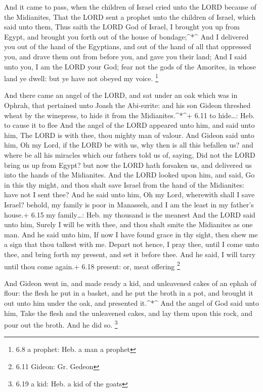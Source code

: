  And it came to pass, when the children of Israel cried unto
the LORD because of the Midianites,  That the LORD sent a
prophet unto the children of Israel, which said unto them, Thus saith
the LORD God of Israel, I brought you up from Egypt, and brought you
forth out of the house of bondage;\^{}*\^{}  And I delivered
you out of the hand of the Egyptians, and out of the hand of all that
oppressed you, and drave them out from before you, and gave you their
land;  And I said unto you, I am the LORD your God; fear
not the gods of the Amorites, in whose land ye dwell: but ye have not
obeyed my voice. \footnote{6.8 a prophet: Heb. a man a prophet}

 And there came an angel of the LORD, and sat under an oak
which was in Ophrah, that pertained unto Joash the Abi-ezrite: and his
son Gideon threshed wheat by the winepress, to hide it from the
Midianites.\^{}*\^{}+ 6.11 to hide\ldots: Heb. to cause it to flee
 And the angel of the LORD appeared unto him, and said unto
him, The LORD is with thee, thou mighty man of valour.  And
Gideon said unto him, Oh my Lord, if the LORD be with us, why then is
all this befallen us? and where be all his miracles which our fathers
told us of, saying, Did not the LORD bring us up from Egypt? but now the
LORD hath forsaken us, and delivered us into the hands of the
Midianites.  And the LORD looked upon him, and said, Go in
this thy might, and thou shalt save Israel from the hand of the
Midianites: have not I sent thee?  And he said unto him, Oh
my Lord, wherewith shall I save Israel? behold, my family is poor in
Manasseh, and I am the least in my father's house.+ 6.15 my
family\ldots: Heb. my thousand is the meanest  And the LORD
said unto him, Surely I will be with thee, and thou shalt smite the
Midianites as one man.  And he said unto him, If now I have
found grace in thy sight, then shew me a sign that thou talkest with me.
 Depart not hence, I pray thee, until I come unto thee, and
bring forth my present, and set it before thee. And he said, I will
tarry until thou come again.+ 6.18 present: or, meat offering
\footnote{6.11 Gideon: Gr. Gedeon}

 And Gideon went in, and made ready a kid, and unleavened
cakes of an ephah of flour: the flesh he put in a basket, and he put the
broth in a pot, and brought it out unto him under the oak, and presented
it.\^{}*\^{}  And the angel of God said unto him, Take the
flesh and the unleavened cakes, and lay them upon this rock, and pour
out the broth. And he did so. \footnote{6.19 a kid: Heb. a kid of the
  goats}

